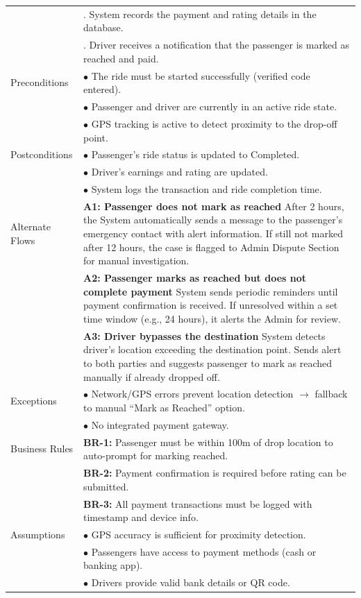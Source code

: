 \begin{longtable}{|>{\raggedright\arraybackslash}p{4cm}|>{\raggedright\arraybackslash}p{11cm}|}
& 9. System records the payment and rating details in the database. \\
& 10. Driver receives a notification that the passenger is marked as reached and paid. \\
\hline
Preconditions & $\bullet$ The ride must be started successfully (verified code entered). \\
& $\bullet$ Passenger and driver are currently in an active ride state. \\
& $\bullet$ GPS tracking is active to detect proximity to the drop-off point. \\
\hline
Postconditions & $\bullet$ Passenger's ride status is updated to Completed. \\
& $\bullet$ Driver's earnings and rating are updated. \\
& $\bullet$ System logs the transaction and ride completion time. \\
\hline
Alternate Flows & \textbf{A1: Passenger does not mark as reached} \newline After 2 hours, the System automatically sends a message to the passenger's emergency contact with alert information. If still not marked after 12 hours, the case is flagged to Admin Dispute Section for manual investigation. \\
& \textbf{A2: Passenger marks as reached but does not complete payment} \newline System sends periodic reminders until payment confirmation is received. If unresolved within a set time window (e.g., 24 hours), it alerts the Admin for review. \\
& \textbf{A3: Driver bypasses the destination} \newline System detects driver's location exceeding the destination point. Sends alert to both parties and suggests passenger to mark as reached manually if already dropped off. \\
\hline
Exceptions & $\bullet$ Network/GPS errors prevent location detection $\rightarrow$ fallback to manual ``Mark as Reached'' option. \\
& $\bullet$ No integrated payment gateway. \\
\hline
Business Rules & \textbf{BR-1:} Passenger must be within 100m of drop location to auto-prompt for marking reached. \\
& \textbf{BR-2:} Payment confirmation is required before rating can be submitted. \\
& \textbf{BR-3:} All payment transactions must be logged with timestamp and device info. \\
\hline
Assumptions & $\bullet$ GPS accuracy is sufficient for proximity detection. \\
& $\bullet$ Passengers have access to payment methods (cash or banking app). \\
& $\bullet$ Drivers provide valid bank details or QR code. \\
\hline
\end{longtable}

